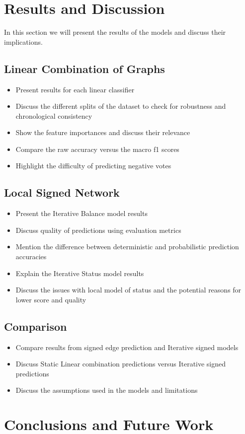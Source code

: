 \chapter{Results and Discussion} 
In this section we will present the results of the models and discuss their implications.
\section{Linear Combination of Graphs}
\begin{itemize}
    \item Present results for each linear classifier
    \item Discuss the different splits of the dataset to check for robustness and chronological consistency
    \item Show the feature importances and discuss their relevance 
    \item Compare the raw accuracy versus the macro f1 scores
    \item Highlight the difficulty of predicting negative votes
\end{itemize}
\section{Local Signed Network}
\begin{itemize}
    \item Present the Iterative Balance model results
    \item Discuss quality of predictions using evaluation metrics
    \item Mention the difference between deterministic and probabilistic prediction accuracies
    \item Explain the Iterative Status model results 
    \item Discuss the issues with local model of status and the potential reasons for lower score and quality
\end{itemize}
\section{Comparison}
\begin{itemize}
    \item Compare results from signed edge prediction and Iterative signed models
    \item Discuss Static Linear combination predictions versus Iterative signed predictions 
    \item Discuss the assumptions used in the models and limitations 
\end{itemize}

\chapter{Conclusions and Future Work}
